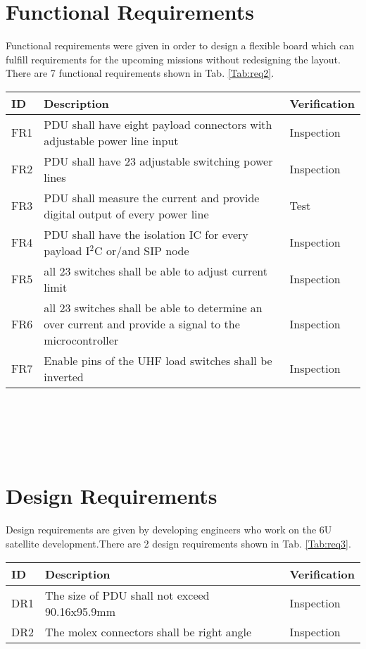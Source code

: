 \section{Functional Requirements}
Functional requirements were given in order to design a flexible board which can fulfill requirements for the upcoming missions without redesigning the layout. There are 7 functional requirements shown in Tab. \ref{Tab:req2}. 
\begin{tabular}{p{1cm}p{11cm}p{2cm}} \toprule
	ID & Description & Verification\\ \midrule
FR1 & PDU shall have eight payload connectors with adjustable power line input & Inspection\\
FR2 & PDU shall have 23 adjustable switching power lines & Inspection\\
FR3 & PDU shall measure the current and provide digital output of every power line & Test\\
FR4 & PDU shall have the isolation IC for every payload I$^2$C or/and SIP node & Inspection\\
FR5 &  all 23 switches shall be able to adjust current limit & Inspection\\
FR6 & all 23 switches shall be able to determine an over current and provide a signal to the microcontroller & Inspection\\
FR7 & Enable pins of the UHF load switches shall be inverted & Inspection\\
\bottomrule
\end{tabular}\\ \\ \\ \\
\label{Tab:req2}

\section{Design Requirements}
Design requirements are given by developing engineers who work on the 6U satellite development.There are 2 design requirements  shown in Tab. \ref{Tab:req3}. 

\begin{tabular}{p{1cm}p{11cm}p{2cm}} \toprule
	ID & Description & Verification \\ \midrule
DR1 & The size of PDU shall not exceed 90.16x95.9mm & Inspection\\
  
DR2 & The molex connectors shall be right angle & Inspection\\
\bottomrule
\end{tabular}\\ 
\label{Tab:req3}




